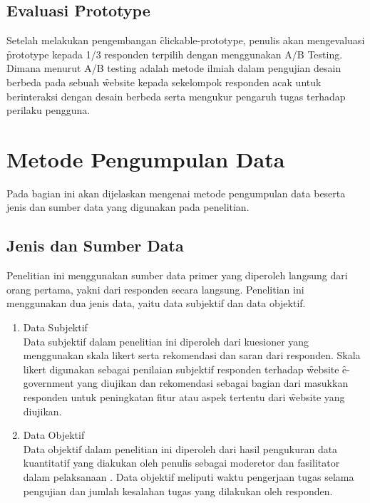 \subsection{Evaluasi \f{Prototype}}
Setelah melakukan pengembangan \f{clickable-prototype}, penulis akan mengevaluasi \f{prototype} kepada 1/3 responden terpilih dengan menggunakan A/B Testing. Dimana menurut \citet{article.rohrer} A/B testing adalah metode ilmiah dalam pengujian desain berbeda pada sebuah \f{website} kepada sekelompok responden acak untuk berinteraksi dengan desain berbeda serta mengukur pengaruh tugas terhadap perilaku pengguna.
\section{Metode Pengumpulan Data}
Pada bagian ini akan dijelaskan mengenai metode pengumpulan data beserta jenis dan sumber data yang digunakan pada penelitian.  
\subsection{Jenis dan Sumber Data}
Penelitian ini menggunakan sumber data primer yang diperoleh langsung dari orang pertama, yakni dari responden secara langsung. Penelitian ini menggunakan dua jenis data, yaitu data subjektif dan data objektif.
\begin{enumerate}
	\item Data Subjektif\\
	Data subjektif dalam penelitian ini diperoleh dari kuesioner yang menggunakan skala likert serta rekomendasi dan saran dari responden. Skala likert digunakan sebagai penilaian subjektif responden terhadap \f{website} \f{e-government} yang diujikan dan rekomendasi sebagai bagian dari masukkan responden untuk peningkatan fitur atau aspek tertentu dari \f{website} yang diujikan. 
	\item Data Objektif\\
	Data objektif dalam penelitian ini diperoleh dari hasil pengukuran data kuantitatif yang diakukan oleh penulis sebagai moderetor dan fasilitator dalam pelaksanaan \ust. Data objektif meliputi waktu pengerjaan tugas selama pengujian dan jumlah kesalahan tugas yang dilakukan oleh responden.
\end{enumerate}
